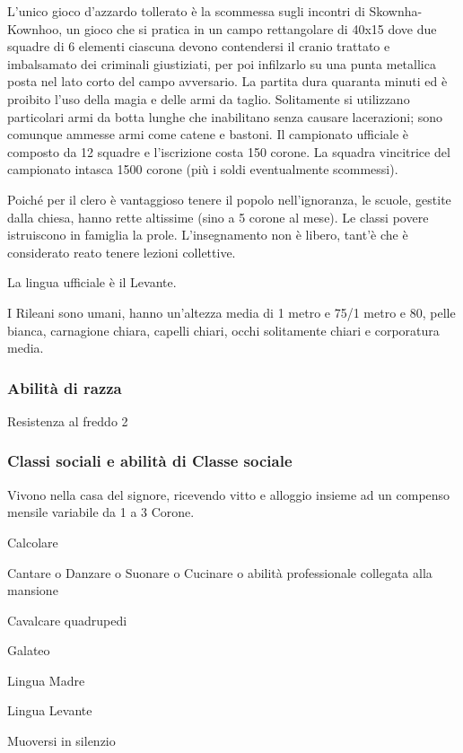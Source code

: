 L'unico gioco d'azzardo tollerato \`e la scommessa sugli incontri di
Skownha-Kownhoo, un gioco che si pratica in un campo rettangolare di
40x15 dove due squadre di 6 elementi ciascuna devono contendersi il
cranio trattato e imbalsamato dei criminali giustiziati, per poi
infilzarlo su una punta metallica posta nel lato corto del campo
avversario. La partita dura quaranta minuti ed \`e proibito l'uso
della magia e delle armi da taglio.  Solitamente si utilizzano
particolari armi da botta lunghe che inabilitano senza causare
lacerazioni; sono comunque ammesse armi come catene e bastoni. Il
campionato ufficiale \`e composto da 12 squadre e l'iscrizione costa
150 corone. La squadra vincitrice del campionato intasca 1500 corone
(pi\`u i soldi eventualmente scommessi).

Poich\'e per il clero \`e vantaggioso tenere il popolo nell'ignoranza,
le scuole, gestite dalla chiesa, hanno rette altissime (sino a 5
corone al mese).  Le classi povere istruiscono in famiglia la prole.
L'insegnamento non \`e libero, tant'\`e che \`e considerato reato
tenere lezioni collettive. 

La lingua ufficiale \`e il Levante.

\Fisico I Rileani sono umani, hanno un'altezza media di 1 metro e 75/1
metro e 80, pelle bianca, carnagione chiara, capelli chiari, occhi
solitamente chiari e corporatura media.

\minmaxumani


\subsubsection{Abilit\`a di razza}

\begin{abilist}
\item Resistenza al freddo 2
\end{abilist}

\subsubsection{Classi sociali e abilit\`a di Classe sociale}


Vivono nella casa del signore, ricevendo vitto e alloggio insieme ad
un compenso mensile variabile da 1 a 3 Corone.

\begin{abilist}
\item Calcolare
\item Cantare o Danzare o Suonare o Cucinare o abilit\`a professionale
  collegata alla mansione
\item Cavalcare quadrupedi
\item Galateo
\item Lingua Madre
\item Lingua Levante
\item Muoversi in silenzio
\end{abilist}

